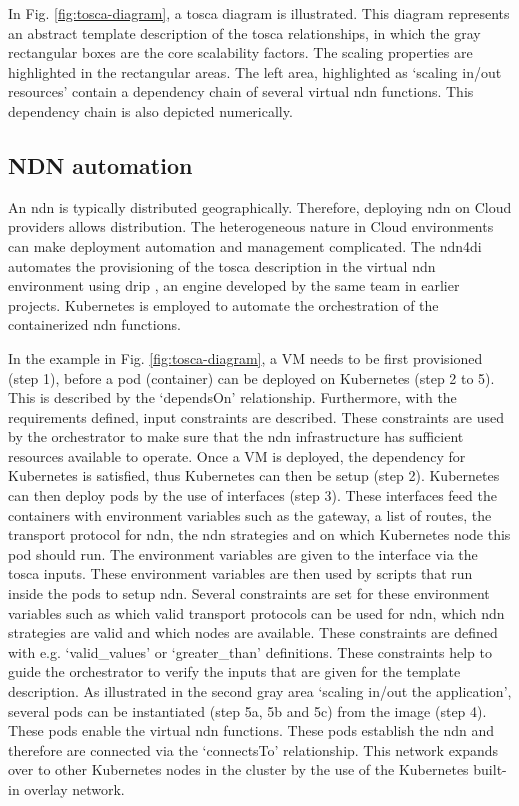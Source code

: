 \documentclass[conference]{IEEEtran}
\begin{document}
In Fig. \ref{fig:tosca-diagram}, a \gls{tosca} diagram is illustrated. This diagram represents an abstract template description of the \gls{tosca} relationships, in which the gray rectangular boxes are the core scalability factors. The scaling properties are highlighted in the rectangular areas. The left area, highlighted as `scaling in/out resources' contain a dependency chain of several virtual \gls{ndn} functions. This dependency chain is also depicted numerically.


\subsection{NDN automation}

An \gls{ndn} is typically distributed geographically. Therefore, deploying \gls{ndn} on Cloud providers allows distribution. The heterogeneous nature in Cloud environments can make deployment automation and management complicated. The \gls{ndn4di} automates the provisioning of the \gls{tosca} description in the virtual \gls{ndn} environment using \gls{drip} \cite{koulouzis2019time}, an engine developed by the same team in earlier projects. Kubernetes is employed to automate the orchestration of the containerized \gls{ndn} functions. 

In the example in Fig. \ref{fig:tosca-diagram}, a VM needs to be first provisioned (step 1), before a pod (container) can be deployed on Kubernetes (step 2 to 5). This is described by the `dependsOn' relationship. Furthermore, with the requirements defined, input constraints are described. These constraints are used by the orchestrator to make sure that the \gls{ndn} infrastructure has sufficient resources available to operate. Once a VM is deployed, the dependency for Kubernetes is satisfied, thus Kubernetes can then be setup (step 2). Kubernetes can then deploy pods by the use of interfaces (step 3). These interfaces feed the containers with environment variables such as the gateway, a list of routes, the transport protocol for \gls{ndn}, the \gls{ndn} strategies and on which Kubernetes node this pod should run. The environment variables are given to the interface via the \gls{tosca} inputs. These environment variables are then used by scripts that run inside the pods to setup \gls{ndn}. Several constraints are set for these environment variables such as which valid transport protocols can be used for \gls{ndn}, which \gls{ndn} strategies are valid and which nodes are available. These constraints are defined with e.g. `valid\_values' or `greater\_than' definitions. These constraints help to guide the orchestrator to verify the inputs that are given for the template description. As illustrated in the second gray area `scaling in/out the application', several pods can be instantiated (step 5a, 5b and 5c) from the image (step 4). These pods enable the virtual \gls{ndn} functions. These pods establish the \gls{ndn} and therefore are connected via the `connectsTo' relationship. This network expands over to other Kubernetes nodes in the cluster by the use of the Kubernetes built-in overlay network.
\end{document}

